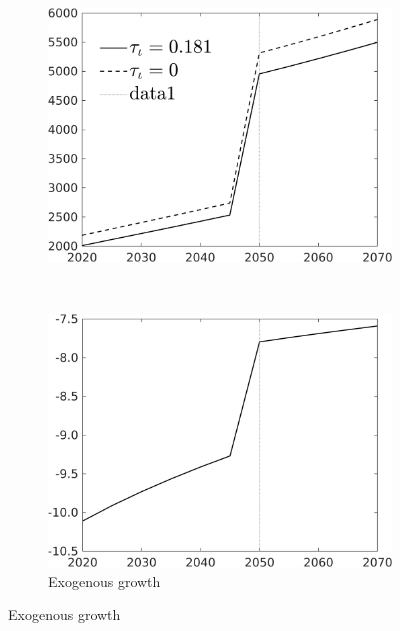 \begin{figure}[h!!]
	\begin{subfigure}{0.7\textwidth}
		\caption{Exogenous growth}
		\begin{minipage}[]{0.45\textwidth}
			\includegraphics[width=1\textwidth]{../../codding_model/own_basedOnFried/optimalPol_010922_revision/figures/all_13Sept22/CompTauf_bytaul_Reg5_Tauf_spillover0_nsk1_xgr0_knspil0_sep0_LFlimit1_emsbase0_countec0_GovRev0_etaa0.79_lgd1.png}
		\end{minipage}\begin{minipage}[]{0.05\textwidth}
		\
	\end{minipage}		
		\begin{minipage}[]{0.45\textwidth}
			\includegraphics[width=1\textwidth]{../../codding_model/own_basedOnFried/optimalPol_010922_revision/figures/all_13Sept22/CompTaufPER_bytaul_Reg5_Tauf_spillover0_nsk0_xgr1_knspil0_sep0_LFlimit1_emsbase0_countec0_GovRev0_etaa0.79_lgd0.png} 
		\end{minipage}	
	\end{subfigure}


\end{figure}
